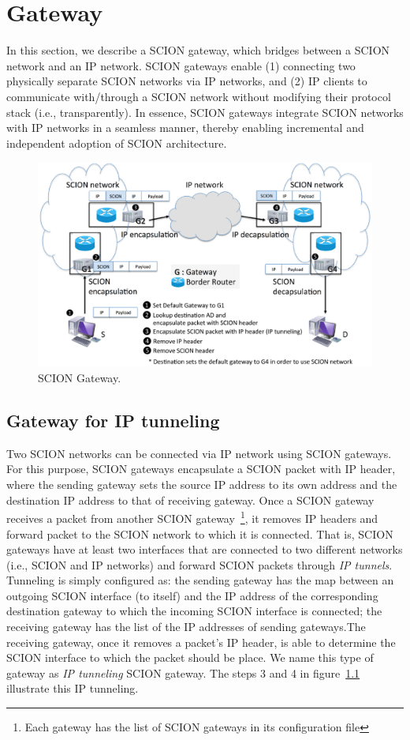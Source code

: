 \chapter{Gateway}
In this section, we describe a SCION gateway, which bridges between a SCION network and an IP network. SCION gateways enable (1) connecting two physically separate SCION networks via IP networks, and (2) IP clients to communicate with/through a SCION network without modifying their protocol stack (i.e., transparently). In essence, SCION gateways integrate SCION networks with IP networks in a seamless manner, thereby enabling incremental and independent adoption of SCION architecture. 

\begin{figure}[ht]
\centering
\includegraphics[width=\columnwidth]{./fig/gateway.eps}
\caption{SCION Gateway.}\label{fig:gateway}
\end{figure}

\section{Gateway for IP tunneling}
Two SCION networks can be connected via IP network using SCION gateways. For this purpose, SCION gateways encapsulate a SCION packet with IP header, where the sending gateway sets the source IP address to its own address and the destination IP address to that of receiving gateway. Once a SCION gateway receives a packet from another SCION gateway~\footnote{Each gateway has the list of SCION gateways in its configuration file}, it removes IP headers and forward packet to the SCION network to which it is connected. That is, SCION gateways have at least two interfaces that are connected to two different networks (i.e., SCION and IP networks) and forward SCION packets through {\em IP tunnels}. Tunneling is simply configured as: the sending gateway has the map between an outgoing SCION interface (to itself) and the IP address of the corresponding destination gateway to which the incoming SCION interface is connected; the receiving gateway has the list of the IP addresses of sending gateways.The receiving gateway, once it removes a packet's IP header, is able to determine the SCION interface to which the packet should be place. We name this type of gateway as {\em IP tunneling} SCION gateway. The steps 3 and 4 in figure~\ref{fig:gateway} illustrate this IP tunneling. 

